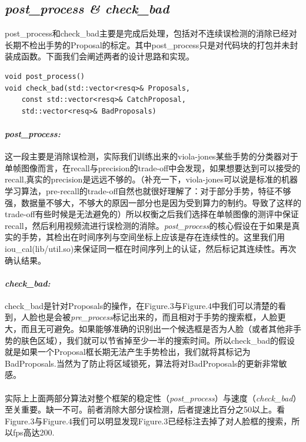 \documentclass{article}
\begin{document}
	\subsection{\emph{post\_process \& check\_bad}}{post\_process和check\_bad主要是完成后处理，包括对不连续误检测的消除已经对长期不检出手势的Proposal的标定。其中post\_process只是对代码块的打包并未封装成函数。下面我们会阐述两者的设计思路和实现。
\lstset{language=C++}
\begin{lstlisting}
void post_process()
void check_bad(std::vector<resq>& Proposals,
	const std::vector<resq>& CatchProposal, 
	std::vector<resq>& BadProposals)
\end{lstlisting}
\paragraph{{\large \textbf{\emph{post\_process:}}}}这一段主要是消除误检测，实际我们训练出来的viola-jones某些手势的分类器对于单帧图像而言，在recall与precision的trade-off中会发现，如果想要达到可以接受的recall,真实的precision是远远不够的。（补充一下，viola-jones可以说是标准的机器学习算法，pre-recall的trade-off自然也就很好理解了：对于部分手势，特征不够强，数据量不够大，不够大的原因一部分也是因为受到算力的制约。导致了这样的trade-off有些时候是无法避免的）所以权衡之后我们选择在单帧图像的测评中保证recall，然后利用视频流进行误检测的消除。{\color{red}\emph{post\_process}的核心假设在于如果是真实的手势，其检出在时间序列与空间坐标上应该是存在连续性的}。这里我们用iou\_cal(lib/util.so)来保证同一框在时间序列上的认证，然后标记其连续性。再次确认结果。
\paragraph{{\large \textbf{\emph{check\_bad:}}}}check\_bad是针对Proposals的操作，在Figure.3与Figure.4中我们可以清楚的看到，人脸也是会被\emph{pre\_process}标记出来的，而且相对于手势的搜索框，人脸更大，而且无可避免。如果能够准确的识别出一个候选框是否为人脸（或者其他非手势的肤色区域），我们就可以节省掉至少一半的搜索时间。{\color{red}所以check\_bad的假设就是如果一个Proposal框长期无法产生手势检出，我们就将其标记为BadProposals}.当然为了防止将区域锁死，算法将对BadProposals的更新非常敏感。
\paragraph{}实际上上面两部分算法对整个框架的稳定性（\emph{post\_process}）与速度（\emph{check\_bad}）至关重要。缺一不可。前者消除大部分误检测，后者提速比百分之50以上。看Figure.3与Figure.4我们可以明显发现Figure.3已经标注去掉了对人脸框的搜索，所以fps高达200.

}
\end{document}
